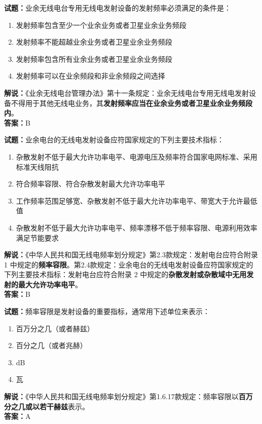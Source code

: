 \documentclass{ctexbook}
\begin{document}
\bigskip


\noindent\textbf{试题：}业余无线电台专用无线电发射设备的发射频率必须满足的条件是：
\begin{enumerate}[leftmargin=3em]
	\item 发射频率包含至少一个业余业务或者卫星业余业务频段
	\item 发射频率不能超越业余业务或者卫星业余业务频段
	\item 发射频率包含所有业余业务或者卫星业余业务频段
	\item 发射频率可以在业余频段和非业余频段之间选择
\end{enumerate}
\noindent\textbf{解说：}《业余无线电台管理办法》第十一条规定：业余无线电台专用无线电发射设备不得用于其他无线电业务，其\textbf{发射频率应当在业余业务或者卫星业余业务频段内}。\\\noindent\textbf{答案：}B


\bigskip


\noindent\textbf{试题：}业余电台的无线电发射设备应符国家规定的下列主要技术指标：
\begin{enumerate}[leftmargin=3em]
	\item 杂散发射不低于最大允许功率电平、电源电压及频率符合国家电网标准、采用标准天线阻抗
	\item 符合频率容限、符合杂散发射最大允许功率电平
	\item 工作频率范围足够宽、杂散发射不低于最大允许功率电平、带宽大于允许最低值
	\item 杂散发射不低于最大允许功率电平、频率漂移不低于频率容限、电源利用效率满足节能要求
\end{enumerate}
\noindent\textbf{解说：}《中华人民共和国无线电频率划分规定》第2.3款规定：发射电台应符合附录 1 中规定的\textbf{频率容限}。第2.4款规定：业余电台的无线电发射设备应符国家规定的下列主要技术指标：发射电台应符合附录 2 中规定的\textbf{杂散发射或杂散域中无用发射的最大允许功率电平}。\\\noindent\textbf{答案：}B



\bigskip


\noindent\textbf{试题：}频率容限是发射设备的重要指标，通常用下述单位来表示：
\begin{enumerate}[leftmargin=3em]
	\item 百万分之几（或者赫兹）
	\item 百分之几（或者兆赫）
	\item dB
	\item 瓦
\end{enumerate}
\noindent\textbf{解说：}《中华人民共和国无线电频率划分规定》第1.6.17款规定：频率容限以\textbf{百万分之几或以若干赫兹}表示。\\\noindent\textbf{答案：}A
\end{document}
